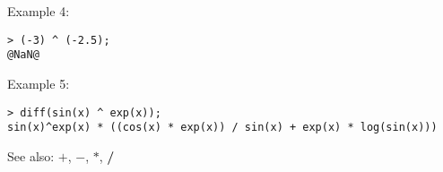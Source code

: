 \noindent Example 4: 
\begin{center}\begin{minipage}{15cm}\begin{Verbatim}[frame=single]
> (-3) ^ (-2.5);
@NaN@
\end{Verbatim}
\end{minipage}\end{center}
\noindent Example 5: 
\begin{center}\begin{minipage}{15cm}\begin{Verbatim}[frame=single]
> diff(sin(x) ^ exp(x));
sin(x)^exp(x) * ((cos(x) * exp(x)) / sin(x) + exp(x) * log(sin(x)))
\end{Verbatim}
\end{minipage}\end{center}
See also: \textbf{$+$}, \textbf{$-$}, \textbf{$*$}, \textbf{/}
